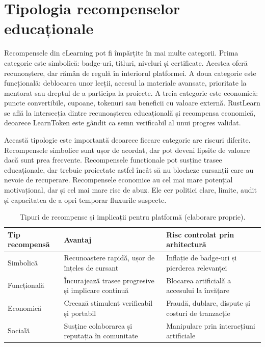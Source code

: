 \section{Tipologia recompenselor educaționale}
Recompensele din eLearning pot fi împărțite în mai multe categorii. Prima categorie este simbolică: badge-uri, titluri, niveluri și certificate. Acestea oferă recunoaștere, dar rămân de regulă în interiorul platformei. A doua categorie este funcțională: deblocarea unor lecții, accesul la materiale avansate, prioritate la mentorat sau dreptul de a participa la proiecte. A treia categorie este economică: puncte convertibile, cupoane, tokenuri sau beneficii cu valoare externă. RustLearn se află la intersecția dintre recunoașterea educațională și recompensa economică, deoarece LearnToken este gândit ca semn verificabil al unui progres validat.

Această tipologie este importantă deoarece fiecare categorie are riscuri diferite. Recompensele simbolice sunt ușor de acordat, dar pot deveni lipsite de valoare dacă sunt prea frecvente. Recompensele funcționale pot susține trasee educaționale, dar trebuie proiectate astfel încât să nu blocheze cursanții care au nevoie de recuperare. Recompensele economice au cel mai mare potențial motivațional, dar și cel mai mare risc de abuz. Ele cer politici clare, limite, audit și capacitatea de a opri temporar fluxurile suspecte.

\begin{table}[H]
    \centering
    \caption{Tipuri de recompense și implicații pentru platformă (elaborare proprie).}
    \label{tab:tipuri_recompense}
    \begin{tabular}{P{3.2cm}P{5cm}P{5.4cm}}
        \toprule
        Tip recompensă & Avantaj & Risc controlat prin arhitectură \\
        \midrule
        Simbolică & Recunoaștere rapidă, ușor de înțeles de cursant & Inflație de badge-uri și pierderea relevanței \\
        Funcțională & Încurajează trasee progresive și implicare continuă & Blocarea artificială a accesului la învățare \\
        Economică & Creează stimulent verificabil și portabil & Fraudă, dublare, dispute și costuri de tranzacție \\
        Socială & Susține colaborarea și reputația în comunitate & Manipulare prin interacțiuni artificiale \\
        \bottomrule
    \end{tabular}
\end{table}

